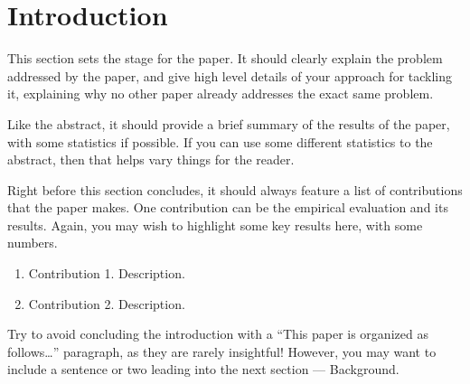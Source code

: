 \section{Introduction}
\label{sec:introduction}

This section sets the stage for the paper. 
It should clearly explain the problem addressed by the 
paper, and give high level details of your approach
for tackling it, explaining why no other paper already
addresses the exact same problem.

Like the abstract, it should provide a brief summary of 
the results of the paper, with some statistics if possible. 
If you can use some different statistics to the 
abstract, then that helps vary things for the reader.

Right before this section concludes, it should always
feature a list of contributions that the paper makes.
One contribution can be the empirical evaluation and
its results. Again, you may wish to highlight some 
key results here, with some numbers. 

\begin{enumerate}

    \item Contribution 1. Description.

    \item Contribution 2. Description.

\end{enumerate}    

Try to avoid concluding the introduction with a 
``This paper is organized as follows\ldots'' paragraph,
as they are rarely insightful! 
%
However, you may want to include a sentence or two 
leading into the next section --- Background.